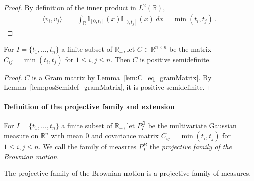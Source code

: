 \begin{proof}\leanok
By definition of the inner product in $L^2(\mathbb{R})$,
\begin{align*}
  \langle v_i, v_j \rangle
  &= \int_{\mathbb{R}} \mathbb{I}_{[0, t_i]}(x) \mathbb{I}_{[0, t_j]}(x) \: dx
  = \min(t_i, t_j)
  \: .
\end{align*}
\end{proof}


\begin{lemma}\label{lem:posSemidef_brownianCov}
  \leanok
For $I = \{t_1, \ldots, t_n\}$ a finite subset of $\mathbb{R}_+$, let $C \in \mathbb{R}^{n \times n}$ be the matrix $C_{ij} = \min(t_i, t_j)$ for $1 \leq i,j \leq n$.
Then $C$ is positive semidefinite.
\end{lemma}

\begin{proof}\leanok
$C$ is a Gram matrix by Lemma~\ref{lem:C_eq_gramMatrix}.
By Lemma~\ref{lem:posSemidef_gramMatrix}, it is positive semidefinite.
\end{proof}


\paragraph{Definition of the projective family and extension}

\begin{definition}\label{def:gaussianProjectiveFamily}
  \leanok
For $I = \{t_1, \ldots, t_n\}$ a finite subset of $\mathbb{R}_+$, let $P^B_I$ be the multivariate Gaussian measure on $\mathbb{R}^n$ with mean $0$ and covariance matrix $C_{ij} = \min(t_i, t_j)$ for $1 \leq i,j \leq n$.
We call the family of measures $P^B_I$ the \emph{projective family of the Brownian motion}.
\end{definition}


\begin{lemma}\label{lem:isProjectiveMeasureFamily_gaussianProjectiveFamily}
  \leanok
The projective family of the Brownian motion is a projective family of measures.
\end{lemma}


